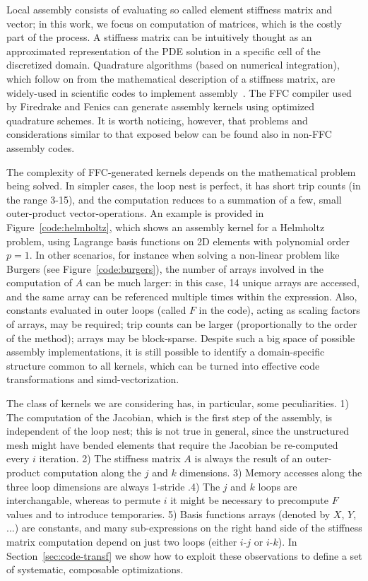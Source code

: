 \documentclass[conference]{IEEEtran}
\begin{document}
Local assembly consists of evaluating so called element stiffness matrix and vector; in this work, we focus on computation of matrices, which is the costly part of the process. A stiffness matrix can be intuitively thought as an approximated representation of the PDE solution in a specific cell of the discretized domain. Quadrature algorithms (based on numerical integration), which follow on from the mathematical description of a stiffness matrix, are widely-used in scientific codes to implement assembly~\cite{quadrature1, quadrature 2}. The FFC compiler used by Firedrake and Fenics can generate assembly kernels using optimized quadrature schemes. It is worth noticing, however, that problems and considerations similar to that exposed below can be found also in non-FFC assembly codes.

The complexity of FFC-generated kernels depends on the mathematical problem being solved. In simpler cases, the loop nest is perfect, it has short trip counts (in the range 3-15), and the computation reduces to a summation of a few, small outer-product vector-operations. An example is provided in Figure~\ref{code:helmholtz}, which shows an assembly kernel for a Helmholtz problem, using Lagrange basis functions on 2D elements with polynomial order $p=1$. In other scenarios, for instance when solving a non-linear problem like Burgers (see Figure~\ref{code:burgers}), the number of arrays involved in the computation of $A$ can be much larger: in this case, 14 unique arrays are accessed, and the same array can be referenced multiple times within the expression. Also, constants evaluated in outer loops (called $F$ in the code), acting as scaling factors of arrays, may be required; trip counts can be larger (proportionally to the order of the method); arrays may be block-sparse. Despite such a big space of possible assembly implementations, it is still possible to identify a domain-specific structure common to all kernels, which can be turned into effective code transformations and simd-vectorization.

The class of kernels we are considering has, in particular, some peculiarities. 1) The computation of the Jacobian, which is the first step of the assembly, is independent of the loop nest; this is not true in general, since the unstructured mesh might have bended elements that require the Jacobian be re-computed every $i$ iteration. 2) The stiffness matrix $A$ is always the result of an outer-product computation along the $j$ and $k$ dimensions. 3) Memory accesses along the three loop dimensions are always 1-stride .4) The $j$ and $k$ loops are interchangable, whereas to permute $i$ it might be necessary to precompute $F$ values and to introduce temporaries. 5) Basis functions arrays (denoted by $X$, $Y$, ...) are constants, and many sub-expressions on the right hand side of the stiffness matrix computation depend on just two loops (either $i$-$j$ or $i$-$k$). In Section~\ref{sec:code-transf} we show how to exploit these observations to define a set of systematic, composable optimizations.
\end{document}
